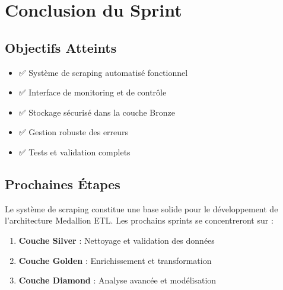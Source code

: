 \section{Conclusion du Sprint}

\subsection{Objectifs Atteints}

\begin{itemize}
    \item ✅ Système de scraping automatisé fonctionnel
    \item ✅ Interface de monitoring et de contrôle
    \item ✅ Stockage sécurisé dans la couche Bronze
    \item ✅ Gestion robuste des erreurs
    \item ✅ Tests et validation complets
\end{itemize}

\subsection{Prochaines Étapes}

Le système de scraping constitue une base solide pour le développement de l'architecture Medallion ETL. Les prochains sprints se concentreront sur :

\begin{enumerate}
    \item \textbf{Couche Silver} : Nettoyage et validation des données
    \item \textbf{Couche Golden} : Enrichissement et transformation
    \item \textbf{Couche Diamond} : Analyse avancée et modélisation
\end{enumerate}
